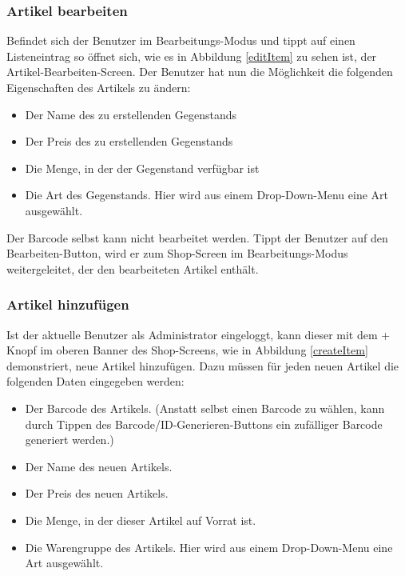 \subsubsection{Artikel bearbeiten} \label{subsubsec:shop-edit-items}

Befindet sich der Benutzer im Bearbeitungs-Modus und tippt auf einen Listeneintrag so öffnet sich, wie es in Abbildung \ref{editItem} zu sehen ist, der Artikel-Bearbeiten-Screen. Der Benutzer hat nun die Möglichkeit die folgenden Eigenschaften des Artikels zu ändern:

\begin{itemize}
	\item Der Name des zu erstellenden Gegenstands

	\item Der Preis des zu erstellenden Gegenstands

	\item Die Menge, in der der Gegenstand verfügbar ist

	\item Die Art des Gegenstands. Hier wird aus einem Drop-Down-Menu eine Art ausgewählt.
\end{itemize}

Der Barcode selbst kann nicht bearbeitet werden. Tippt der Benutzer auf den Bearbeiten-Button, wird er zum Shop-Screen im Bearbeitungs-Modus weitergeleitet, der den bearbeiteten Artikel enthält.


\subsubsection{Artikel hinzufügen} \label{subsubsec:shop-add-items}

Ist der aktuelle Benutzer als Administrator eingeloggt, kann dieser mit dem + Knopf im oberen Banner des Shop-Screens, wie in Abbildung \ref{createItem} demonstriert, neue Artikel hinzufügen. Dazu müssen für jeden neuen Artikel die folgenden Daten eingegeben werden:

\begin{itemize}
	\item Der Barcode des Artikels. (Anstatt selbst einen Barcode zu wählen, kann durch Tippen des Barcode/ID-Generieren-Buttons ein zufälliger Barcode generiert werden.)

	\item Der Name des neuen Artikels.

	\item Der Preis des neuen Artikels.

	\item Die Menge, in der dieser Artikel auf Vorrat ist.

	\item Die Warengruppe des Artikels. Hier wird aus einem Drop-Down-Menu eine Art ausgewählt.
\end{itemize}

